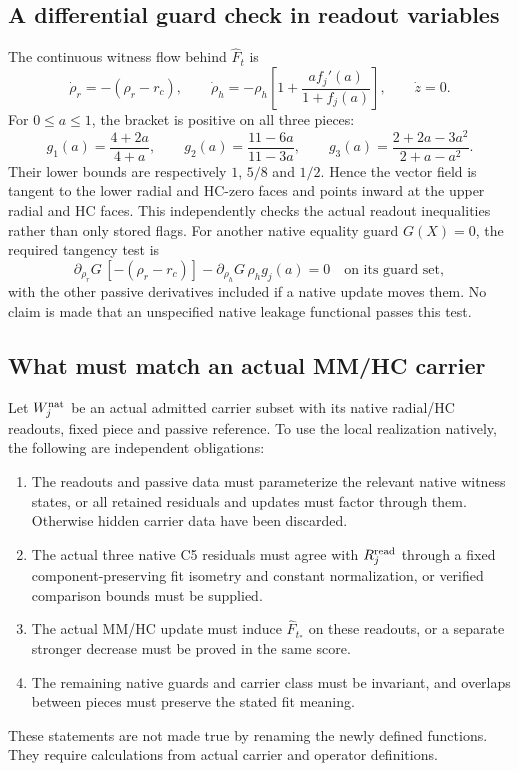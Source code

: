\documentclass[11pt,a4paper]{article}
\begin{document}
\subsection{A differential guard check in readout variables}
The continuous witness flow behind $\widehat F_t$ is
\[
\dot\rho_r=-(\rho_r-r_c),\qquad
\dot\rho_h=-\rho_h\left[1+
\frac{a f_j'(a)}{1+f_j(a)}\right],\qquad\dot z=0.
\]
For $0\le a\le1$, the bracket is positive on all three pieces:
\[
g_1(a)=\frac{4+2a}{4+a},\qquad
g_2(a)=\frac{11-6a}{11-3a},\qquad
g_3(a)=\frac{2+2a-3a^2}{2+a-a^2}.
\]
Their lower bounds are respectively $1$, $5/8$ and $1/2$.
Hence the vector field is tangent to the lower radial and HC-zero faces
and points inward at the upper radial and HC faces. This independently
checks the actual readout inequalities rather than only stored flags.
For another native equality guard $G(X)=0$, the required tangency test is
\[
\partial_{\rho_r}G\,[-(\rho_r-r_c)]
-\partial_{\rho_h}G\,\rho_h g_j(a)=0
\quad\text{on its guard set},
\]
with the other passive derivatives included if a native update moves them.
No claim is made that an unspecified native leakage functional passes this test.

\subsection{What must match an actual MM/HC carrier}
Let $W_j^{\rm nat}$ be an actual admitted carrier subset with its native
radial/HC readouts, fixed piece and passive reference. To use the local
realization natively, the following are independent obligations:
\begin{enumerate}
\item The readouts and passive data must parameterize the relevant native
witness states, or all retained residuals and updates must factor through
them. Otherwise hidden carrier data have been discarded.
\item The actual three native C5 residuals must agree with
$R_j^{\rm read}$ through a fixed component-preserving fit isometry and
constant normalization, or verified comparison bounds must be supplied.
\item The actual MM/HC update must induce $\widehat F_{t_*}$ on these
readouts, or a separate stronger decrease must be proved in the same score.
\item The remaining native guards and carrier class must be invariant,
and overlaps between pieces must preserve the stated fit meaning.
\end{enumerate}
These statements are not made true by renaming the newly defined functions.
They require calculations from actual carrier and operator definitions.
\end{document}
